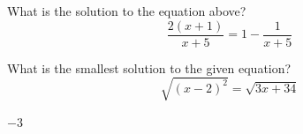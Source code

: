 \newpage



\question[1]
What is the solution to the equation above?
\[
  \frac{2(x+1)}{x+5}=1-\frac{1}{x+5}
\]
\begin{choices}
\end{choices}

\question[1]
What is the smallest solution to the given equation?
\[
  \sqrt{(x-2)^{2}}=\sqrt{3 x+34}
\]
\begin{solutionorbox}
  $-3$
\end{solutionorbox}

